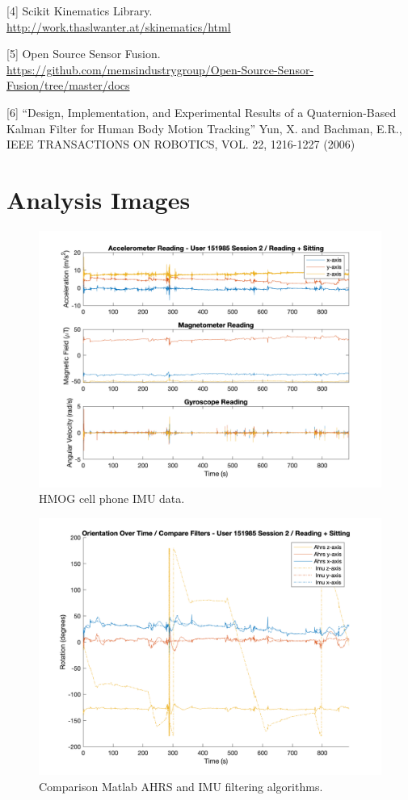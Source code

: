 \documentclass{article}
\begin{document}
[4] Scikit Kinematics Library. \\ \url{http://work.thaslwanter.at/skinematics/html}

[5] Open Source Sensor Fusion. \\ \url{https://github.com/memsindustrygroup/Open-Source-Sensor-Fusion/tree/master/docs}

[6] “Design, Implementation, and Experimental Results of a Quaternion-Based Kalman Filter for Human Body Motion Tracking” Yun, X. and Bachman, E.R., IEEE TRANSACTIONS ON ROBOTICS, VOL. 22, 1216-1227 (2006)

\section{Analysis Images}

\begin{figure}[ht] %
  \includegraphics[width=1\linewidth]{images/151985_2_acc_mag_gyr_data.png}
  \caption[]{HMOG cell phone IMU data.}
  \label{fig:151985_2_imu}
\end{figure}

\begin{figure}[ht]
  \includegraphics[width=1\linewidth]{images/151985_2_orientation_compare_filters.png}
  \caption[]{Comparison Matlab AHRS and IMU filtering algorithms.}
  \label{fig:151985_2_compare_filter}
\end{figure}
\end{document}
